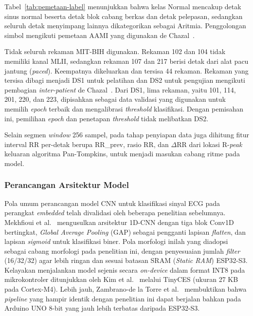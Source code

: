 Tabel~\ref{tab:pemetaan-label} menunjukkan bahwa kelas Normal mencakup detak sinus normal beserta detak blok cabang berkas dan detak pelepasan, sedangkan seluruh detak menyimpang lainnya dikategorikan sebagai Aritmia. Penggolongan simbol mengikuti pemetaan AAMI yang digunakan de Chazal~\cite{aami_ec57_2012, dechazal_2004}.

Tidak seluruh rekaman MIT-BIH digunakan. Rekaman 102 dan 104 tidak memiliki kanal MLII, sedangkan rekaman 107 dan 217 berisi detak dari alat pacu jantung (\textit{paced}). Keempatnya dikeluarkan dan tersisa 44 rekaman. Rekaman yang tersisa dibagi menjadi DS1 untuk pelatihan dan DS2 untuk pengujian mengikuti pembagian \textit{inter-patient} de Chazal~\cite{dechazal_2004}. Dari DS1, lima rekaman, yaitu 101, 114, 201, 220, dan 223, dipisahkan sebagai data validasi yang digunakan untuk memilih \textit{epoch} terbaik dan mengalibrasi \textit{threshold} klasifikasi. Dengan pemisahan ini, pemilihan \textit{epoch} dan penetapan \textit{threshold} tidak melibatkan DS2.

Selain segmen \textit{window} 256 sampel, pada tahap penyiapan data juga dihitung fitur interval RR per-detak berupa RR\_prev, rasio RR, dan $\Delta$RR dari lokasi R-\textit{peak} keluaran algoritma Pan-Tompkins, untuk menjadi masukan cabang ritme pada model.

\subsubsection{Perancangan Arsitektur Model}

Pola umum perancangan model CNN untuk klasifikasi sinyal ECG pada perangkat
\textit{embedded} telah divalidasi oleh beberapa penelitian sebelumnya. Mekhfioui et
al.~\cite{mekhfioui_2025} mengusulkan arsitektur 1D-CNN dengan tiga blok Conv1D
bertingkat, \textit{Global Average Pooling} (GAP) sebagai pengganti lapisan \emph{flatten}, dan
lapisan \textit{sigmoid} untuk klasifikasi biner. Pola morfologi inilah yang diadopsi sebagai
cabang morfologi pada penelitian ini, dengan penyesuaian jumlah \emph{filter}
(16/32/32) agar lebih ringan dan sesuai batasan SRAM (\textit{Static RAM}) ESP32-S3. Kelayakan menjalankan
model sejenis secara \emph{on-device} dalam format INT8 pada mikrokontroler ditunjukkan
oleh Kim et al.~\cite{kim_2023} melalui TinyCES (ukuran 27 KB pada Cortex-M4).
Lebih jauh, Zambrano-de la Torre et al.~\cite{zambrano_2026} membuktikan bahwa \textit{pipeline}
yang hampir identik dengan penelitian ini dapat berjalan bahkan pada Arduino UNO 8-bit
yang jauh lebih terbatas daripada ESP32-S3.

